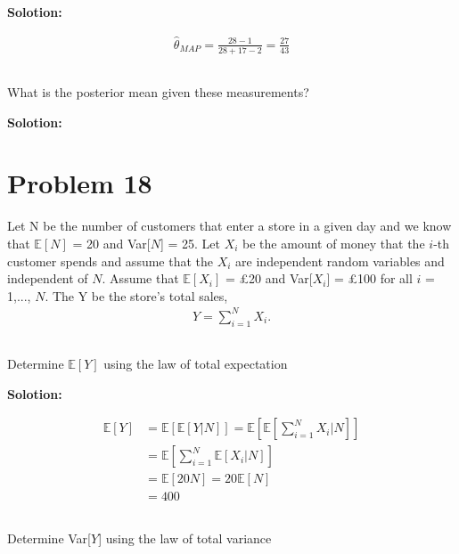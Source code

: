\documentclass[a4paper,11pt,reqno]{amsart}
\begin{document}
\textbf{Solotion:}

$$
\begin{aligned}
    \hat{\theta}_{MAP}=\frac{28-1}{28+17-2}=\frac{27}{43}
\end{aligned}
$$

\subsection{}
What is the posterior mean given these measurements?

\textbf{Solotion:}





\section{Problem 18}
Let N be the number of customers that enter a store in a given day and we know that $\mathbb{E}[N]$ = 20
and Var[$N$] = 25. Let $X_i$ be the amount of money that the $i$-th customer spends and assume that
the $X_i$ are independent random variables and independent of $N$.
Assume that $\mathbb{E}[X_i]$ = £20 and Var[$X_i$] = \pounds100 for all $i$ = 1,..., $N$. 
The Y be the store's total sales,
$$
\begin{aligned}
    Y=\sum^N_{i=1}X_i.
\end{aligned}
$$

\subsection{}
Determine $\mathbb{E}[Y]$ using the law of total expectation

\textbf{Solotion:}

$$
\begin{aligned}
    \mathbb{E}[Y]&=\mathbb{E}[\mathbb{E}[Y|N]]=\mathbb{E}[\mathbb{E}[\sum^N_{i=1}X_i|N]]
    \\
    &=\mathbb{E}[\sum^N_{i=1}\mathbb{E}[X_i|N]]
    \\
    &=\mathbb{E}[20N]=20\mathbb{E}[N]
    \\
    &=400
\end{aligned}
$$

\subsection{}
Determine Var[$Y$] using the law of total variance
\end{document}

